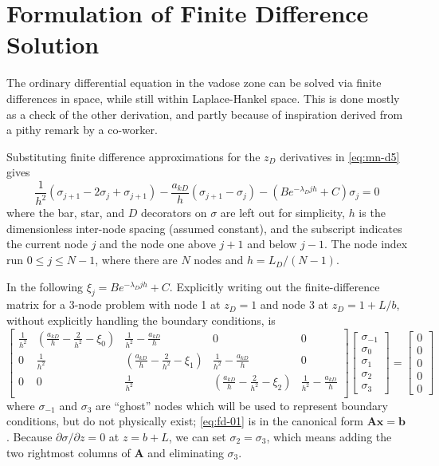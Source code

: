 \documentclass[12pt,letterpaper]{article}
\begin{document}
\section{Formulation of Finite Difference Solution}
The ordinary differential equation in the vadose zone can be solved
via finite differences in space, while still within Laplace-Hankel
space.  This is done mostly as a check of the other derivation, and
partly because of inspiration derived from a pithy remark by a co-worker.

Substituting finite difference approximations for the $z_D$
derivatives in \eqref{eq:mn-d5} gives
\begin{equation}
  \nonumber
  \frac{1}{h^2} \left( \sigma_{j+1} - 2 \sigma_j + \sigma_{j+1}
  \right) - \frac{a_{kD}}{h} \left( \sigma_{j+1} - \sigma_j\right) -
  \left( B e^{-\lambda_D jh} + C \right) \sigma_j
  = 0
\end{equation}
where the bar, star, and $D$ decorators on $\sigma$ are left out for simplicity, $h$ is
the dimensionless inter-node spacing (assumed constant), and
the subscript indicates the current node $j$ and the node one above
$j+1$ and below $j-1$.  The node index run $0 \le j \le N-1$, where
 there are $N$ nodes and $h = L_D / (N - 1)$.

In the following $\xi_j = B e^{-\lambda_D jh} + C$.
Explicitly writing out the finite-difference matrix for a 3-node
problem with node 1 at $z_D=1$ and node 3 at $z_D=1+L/b$, without
explicitly handling the boundary conditions, is
\begin{equation}
  \label{eq:fd-01}
  \left[ \begin{matrix}
    \frac{1}{h^2} & \left(\frac{a_{kD}}{h} - \frac{2}{h^2} - \xi_0\right) &
    \frac{1}{h^2} - \frac{a_{kD}}{h} & 0 & 0 \\ 
    0 & \frac{1}{h^2} & \left(\frac{a_{kD}}{h} - \frac{2}{h^2} - \xi_1 \right)&
    \frac{1}{h^2} - \frac{a_{kD}}{h} & 0  \\ 
    0 & 0 & \frac{1}{h^2} & \left(\frac{a_{kD}}{h} - \frac{2}{h^2}  -
      \xi_2 \right) &
    \frac{1}{h^2} - \frac{a_{kD}}{h} \\ 
  \end{matrix}\right] 
\left[\begin{matrix}
\sigma_{-1} \\ \sigma_0 \\ \sigma_1 \\ \sigma_2 \\ \sigma_3
\end{matrix}\right]
=
\left[\begin{matrix}
0 \\ 0\\ 0 \\ 0 \\ 0
\end{matrix}\right]
\end{equation}
where $\sigma_{-1}$ and $\sigma_3$ are ``ghost'' nodes
which will be used to represent boundary conditions, but do not
physically exist; \eqref{eq:fd-01} is in the canonical form $\mathbf{Ax}=\mathbf{b}$.  Because
$\partial \sigma/\partial z =0$ at $z = b+L$, we can set $\sigma_2=
\sigma_3$, which means adding the two rightmost columns of
$\mathbf{A}$ and eliminating $\sigma_3$.
\end{document}

